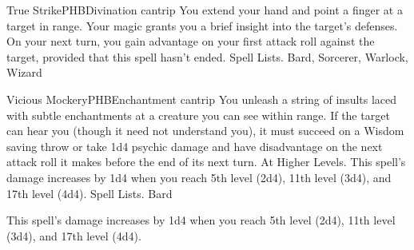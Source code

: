 \begin{spell}{True Strike}{PHB}{Divination cantrip}
{
}
You extend your hand and point a finger at a target in range. Your magic grants you a brief insight into the target’s defenses. On your next turn, you gain advantage on your first attack roll against the target, provided that this spell hasn’t ended.
Spell Lists. Bard, Sorcerer, Warlock, Wizard
\end{spell}

\begin{spell}{Vicious Mockery}{PHB}{Enchantment cantrip}
{
}
You unleash a string of insults laced with subtle enchantments at a creature you can see within range. If the target can hear you (though it need not understand you), it must succeed on a Wisdom saving throw or take 1d4 psychic damage and have disadvantage on the next attack roll it makes before the end of its next turn.
At Higher Levels. This spell’s damage increases by 1d4 when you reach 5th level (2d4), 11th level (3d4), and 17th level (4d4).
Spell Lists. Bard

 This spell’s damage increases by 1d4 when you reach 5th level (2d4), 11th level (3d4), and 17th level (4d4).
\end{spell}

